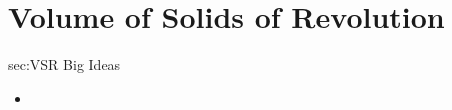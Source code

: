 \chapter{Volume of Solids of Revolution}
\label{chap:VSR}

\begin{bigideas}{sec:VSR Big Ideas}
\begin{itemize}
  \item 
\end{itemize}
\end{bigideas}
